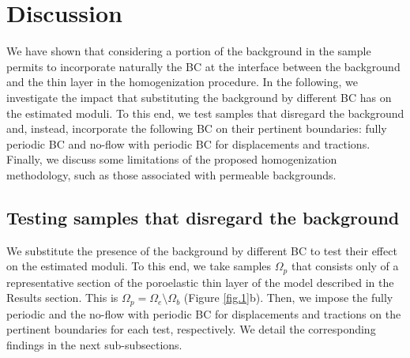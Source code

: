 \documentclass[draft]{agujournal2019}
\begin{document}
\section{Discussion}
We have shown that considering a portion of the background in the sample 
permits to incorporate naturally the BC at the interface between the background and the thin layer in the homogenization procedure. In the following, we investigate the impact that substituting the background by different BC has on the estimated moduli. To this end, we test samples that disregard the background and, instead, incorporate the following BC on their pertinent boundaries: fully periodic BC and  no-flow with periodic BC for displacements and tractions. Finally, we discuss some limitations of the proposed homogenization methodology, such as those associated with permeable backgrounds.

\subsection{Testing samples that disregard the background}
We substitute the presence of the background by different BC to test their effect on the estimated moduli. 
To this end,
we take samples $\Omega_p$ that consists only of a representative section of the poroelastic thin layer of the model described in the Results section.
This is $\Omega_p = \Omega_e  \setminus \Omega_b $ (Figure \ref{fig.1}b). Then, we impose the fully periodic and the no-flow with periodic BC for displacements and tractions on the pertinent boundaries for each test, respectively. We detail the corresponding findings in the next sub-subsections.
\end{document}
